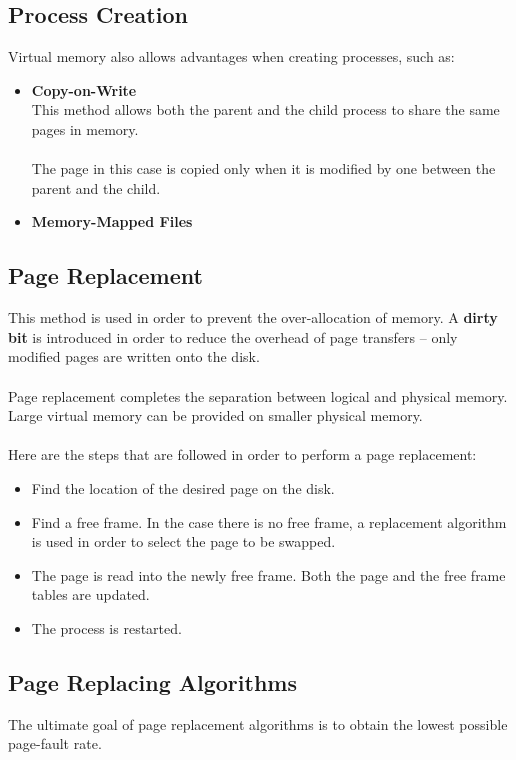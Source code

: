 \documentclass{article}
\begin{document}
\subsection{Process Creation}
Virtual memory also allows advantages when creating processes, such as:

\begin{itemize}
	\item \textbf{Copy-on-Write}
	\vspace{.2cm} \\
	This method allows both the parent and the child process to share the same pages in memory. \\ \\
	The page in this case is copied only when it is modified by one between the parent and the child.
	
	\item \textbf{Memory-Mapped Files}
\end{itemize}

\subsection{Page Replacement}
This method is used in order to prevent the over-allocation of memory. A \textbf{dirty bit} is introduced in order to reduce the overhead of page transfers -- only modified pages are written onto the disk. \\ \\
Page replacement completes the separation between logical and physical memory. Large virtual memory can be provided on smaller physical memory. \\ \\
Here are the steps that are followed in order to perform a page replacement:

\begin{itemize}
	\item Find the location of the desired page on the disk.
	\item Find a free frame. In the case there is no free frame, a replacement algorithm is used in order to select the page to be swapped.
	\item The page is read into the newly free frame. Both the page and the free frame tables are updated.
	\item The process is restarted.
\end{itemize}

\subsection{Page Replacing Algorithms}
The ultimate goal of page replacement algorithms is to obtain the lowest possible page-fault rate.
\end{document}
